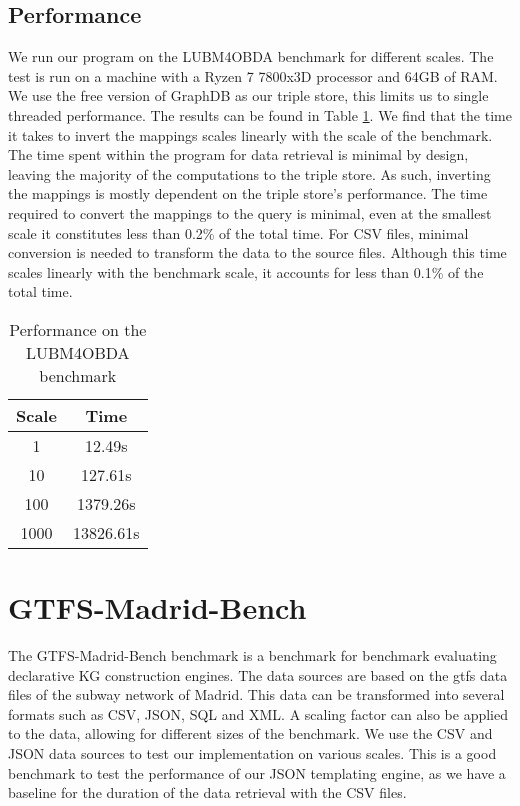 \subsection{Performance}
We run our program on the LUBM4OBDA benchmark for different scales. The test is run on a machine with a Ryzen 7 7800x3D processor and 64GB of RAM. We use the free version of GraphDB as our triple store, this limits us to single threaded performance. The results can be found in Table \ref{table:lubm4obda_performance}. We find that the time it takes to invert the mappings scales linearly with the scale of the benchmark. The time spent within the program for data retrieval is minimal by design, leaving the majority of the computations to the triple store. As such, inverting the mappings is mostly dependent on the triple store's performance. The time required to convert the mappings to the query is minimal, even at the smallest scale it constitutes less than 0.2\% of the total time. For CSV files, minimal conversion is needed to transform the data to the source files. Although this time scales linearly with the benchmark scale, it accounts for less than 0.1\% of the total time.

\begin{table}[h]
    \centering
    \begin{tabular}{|c|c|}
        \hline
        \textbf{Scale} & \textbf{Time} \\
        \hline
        1              & 12.49s        \\
        10             & 127.61s       \\
        100            & 1379.26s      \\
        1000           & 13826.61s     \\
        \hline
    \end{tabular}
    \caption{\centering Performance on the LUBM4OBDA benchmark}
    \label{table:lubm4obda_performance}
\end{table}

\section{GTFS-Madrid-Bench}
\label{section:gtfs-madrid-bench}
The GTFS-Madrid-Bench \citep{gtfs-bench} benchmark is a benchmark for benchmark evaluating declarative KG construction engines. The data sources are based on the \acrfull{gtfs} data files of the subway network of Madrid. This data can be transformed into several formats such as CSV, JSON, SQL and XML. A scaling factor can also be applied to the data, allowing for different sizes of the benchmark. We use the CSV and JSON data sources to test our implementation on various scales. This is a good benchmark to test the performance of our JSON templating engine, as we have a baseline for the duration of the data retrieval with the CSV files.

